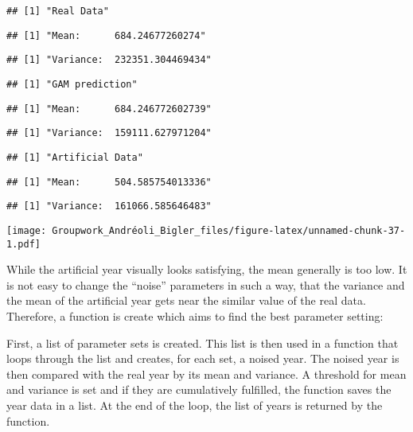 \documentclass[
]{article}
\begin{document}
\begin{verbatim}
## [1] "Real Data"
\end{verbatim}

\begin{verbatim}
## [1] "Mean:      684.24677260274"
\end{verbatim}

\begin{verbatim}
## [1] "Variance:  232351.304469434"
\end{verbatim}

\begin{verbatim}
## [1] "GAM prediction"
\end{verbatim}

\begin{verbatim}
## [1] "Mean:      684.246772602739"
\end{verbatim}

\begin{verbatim}
## [1] "Variance:  159111.627971204"
\end{verbatim}

\begin{verbatim}
## [1] "Artificial Data"
\end{verbatim}

\begin{verbatim}
## [1] "Mean:      504.585754013336"
\end{verbatim}

\begin{verbatim}
## [1] "Variance:  161066.585646483"
\end{verbatim}

\texttt{[image: Groupwork\_Andréoli\_Bigler\_files/figure-latex/unnamed-chunk-37-1.pdf]}

While the artificial year visually looks satisfying, the mean generally
is too low. It is not easy to change the ``noise'' parameters in such a
way, that the variance and the mean of the artificial year gets near the
similar value of the real data. Therefore, a function is create which
aims to find the best parameter setting:

First, a list of parameter sets is created. This list is then used in a
function that loops through the list and creates, for each set, a noised
year. The noised year is then compared with the real year by its mean
and variance. A threshold for mean and variance is set and if they are
cumulatively fulfilled, the function saves the year data in a list. At
the end of the loop, the list of years is returned by the function.
\end{document}
